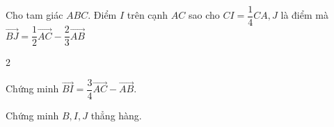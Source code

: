 \begin{bt}%
Cho tam giác $ABC$. Điểm $I$ trên cạnh $AC$ sao cho $CI=\dfrac{1}{4}CA,J$ là điểm mà $\overrightarrow{BJ}=\dfrac{1}{2}\overrightarrow{AC}-\dfrac{2}{3}\overrightarrow{AB}$ 
\begin{enumEX}{2}
\item Chứng minh $\overrightarrow{BI}=\dfrac{3}{4}\overrightarrow{AC}-\overrightarrow{AB}$.
\item Chứng minh $B,I,J$ thẳng hàng.
\end{enumEX}
\end{bt}

